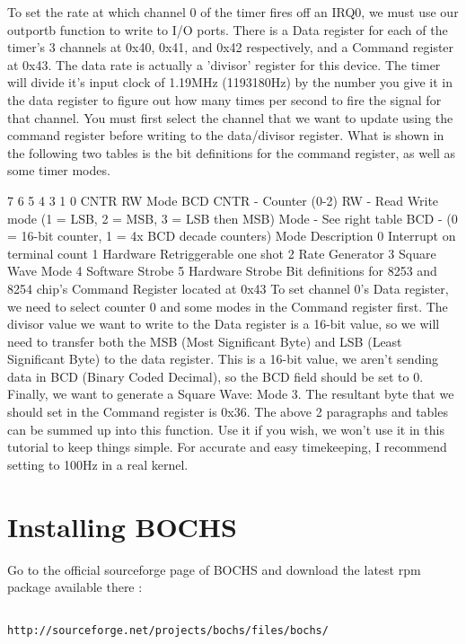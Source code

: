 \documentclass[11pt]{article}
\begin{document}
To set the rate at which channel 0 of the timer fires off an IRQ0, we must use our outportb function to write to I/O ports. There is a Data register for each of the timer's 3 channels at 0x40, 0x41, and 0x42 respectively, and a Command register at 0x43. The data rate is actually a 'divisor' register for this device. The timer will divide it's input clock of 1.19MHz (1193180Hz) by the number you give it in the data register to figure out how many times per second to fire the signal for that channel. You must first select the channel that we want to update using the command register before writing to the data/divisor register. What is shown in the following two tables is the bit definitions for the command register, as well as some timer modes.

7	6	5	4	3	1	0
CNTR	RW	Mode	BCD
CNTR - Counter  (0-2)
RW - Read Write mode
(1 = LSB, 2 = MSB, 3 = LSB then MSB)
Mode - See right table
BCD - (0 = 16-bit counter,
1 = 4x BCD decade counters)
Mode	Description
0	Interrupt on terminal count
1	Hardware Retriggerable one shot
2	Rate Generator
3	Square Wave Mode
4	Software Strobe
5	Hardware Strobe
Bit definitions for 8253 and 8254 chip's Command Register located at 0x43
To set channel 0's Data register, we need to select counter 0 and some modes in the Command register first. The divisor value we want to write to the Data register is a 16-bit value, so we will need to transfer both the MSB (Most Significant Byte) and LSB (Least Significant Byte) to the data register. This is a 16-bit value, we aren't sending data in BCD (Binary Coded Decimal), so the BCD field should be set to 0. Finally, we want to generate a Square Wave: Mode 3. The resultant byte that we should set in the Command register is 0x36. The above 2 paragraphs and tables can be summed up into this function. Use it if you wish, we won't use it in this tutorial to keep things simple. For accurate and easy timekeeping, I recommend setting to 100Hz in a real kernel.





\section{Installing BOCHS}
 
Go to the official sourceforge page of BOCHS and download the latest rpm package available there :
 
\begin{lstlisting}
 
http://sourceforge.net/projects/bochs/files/bochs/

\end{lstlisting}
\end{document}
